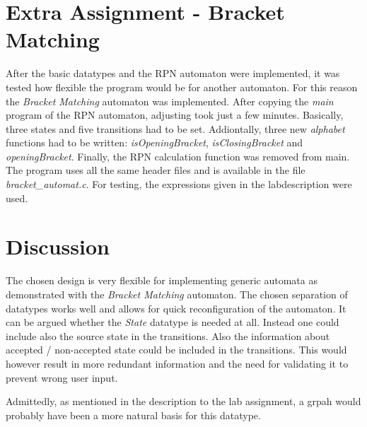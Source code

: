 \documentclass[a4paper,11pt,twoside]{article}
\begin{document}
\section{Extra Assignment - Bracket Matching}
After the basic datatypes and the RPN automaton were implemented, it
was tested how flexible the program would be for another
automaton. For this reason the \textit{Bracket Matching} automaton was
implemented. After copying the \textit{main} program of the RPN
automaton, adjusting took just a few minutes. Basically, three states
and five transitions had to be set.  Addiontally, three new
\textit{alphabet} functions had to be written:
\textit{isOpeningBracket}, \textit{isClosingBracket} and
\textit{openingBracket}. Finally, the RPN calculation function was removed from
main. The program uses all the same header files and is available in
the file \textit{bracket\_automat.c}. For testing, the expressions
given in the labdescription were used. 

\section{Discussion}
The chosen design is very flexible for implementing generic automata
as demonstrated with the \textit{Bracket Matching} automaton. The
chosen separation of datatypes works well and allows for quick
reconfiguration of the automaton. It can be argued whether the
\textit{State} datatype is needed at all. Instead one could include
also the source state in the transitions. Also the information about
accepted / non-accepted state could be included in the
transitions. This would however result in more redundant information
and the need for validating it to prevent wrong user input.

Admittedly, as mentioned in the description to the lab assignment, 
a grpah would probably have been a more natural basis for this
datatype. 



\end{document}
